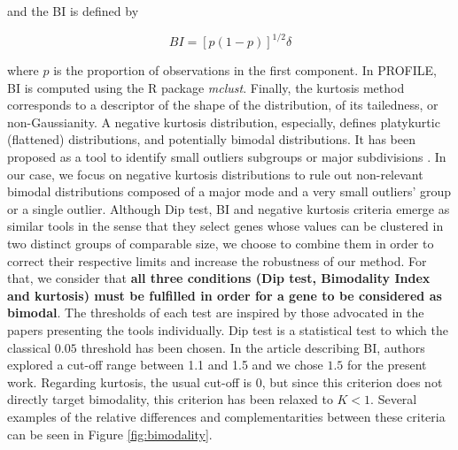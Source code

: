 \documentclass[a4paper,12pt,twoside,onecolumn,openright,final,oldfontcommands]{memoir}
\begin{document}
and the BI is defined by

\[BI=[p(1-p)]^{1/2}\delta\]

where \(p\) is the proportion of observations in the first component. In
PROFILE, BI is computed using the R package \emph{mclust}. Finally, the
kurtosis method corresponds to a descriptor of the shape of the
distribution, of its tailedness, or non-Gaussianity. A negative kurtosis
distribution, especially, defines platykurtic (flattened) distributions,
and potentially bimodal distributions. It has been proposed as a tool to
identify small outliers subgroups or major subdivisions
\citep{teschendorff2006pack}. In our case, we focus on negative kurtosis
distributions to rule out non-relevant bimodal distributions composed of
a major mode and a very small outliers' group or a single outlier.
Although Dip test, BI and negative kurtosis criteria emerge as similar
tools in the sense that they select genes whose values can be clustered
in two distinct groups of comparable size, we choose to combine them in
order to correct their respective limits and increase the robustness of
our method. For that, we consider that \textbf{all three conditions (Dip
test, Bimodality Index and kurtosis) must be fulfilled in order for a
gene to be considered as bimodal}. The thresholds of each test are
inspired by those advocated in the papers presenting the tools
individually. Dip test is a statistical test to which the classical
\(0.05\) threshold has been chosen. In the article describing BI,
authors explored a cut-off range between 1.1 and 1.5 and we chose
\(1.5\) for the present work. Regarding kurtosis, the usual cut-off is
\(0\), but since this criterion does not directly target bimodality,
this criterion has been relaxed to \(K < 1\). Several examples of the
relative differences and complementarities between these criteria can be
seen in Figure \ref{fig:bimodality}.
\end{document}
